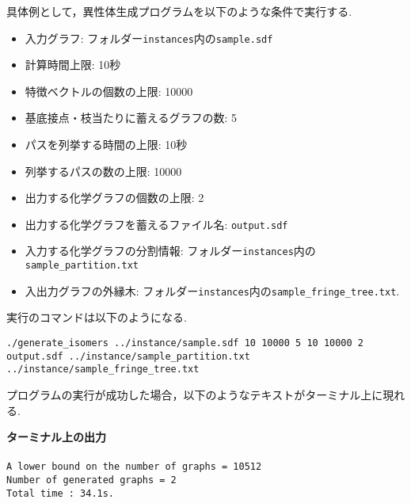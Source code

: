 \documentclass[11pt,titlepage,dvipdfmx,twoside]{jarticle}
\begin{document}
具体例として，異性体生成プログラムを以下のような条件で実行する.

\begin{itemize}
\item 入力グラフ: フォルダー{\tt instances}内の{\tt sample.sdf}
\item 計算時間上限: 10秒
\item 特徴ベクトルの個数の上限: 10000
\item 基底接点・枝当たりに蓄えるグラフの数: 5
\item パスを列挙する時間の上限: 10秒
\item 列挙するパスの数の上限: 10000
\item 出力する化学グラフの個数の上限: 2
\item 出力する化学グラフを蓄えるファイル名: {\tt output.sdf}
\item 入力する化学グラフの分割情報: 
フォルダー{\tt instances}内の{\tt sample\_partition.txt}
\item 入出力グラフの外縁木: 
フォルダー{\tt instances}内の{\tt sample\_fringe\_tree.txt}.
\end{itemize}

実行のコマンドは以下のようになる.

\bigskip


{\tt ./generate\_isomers ../instance/sample.sdf 10 10000 5 10 10000 2} \\
 {\tt output.sdf ../instance/sample\_partition.txt }\\
 {\tt../instance/sample\_fringe\_tree.txt}
%
\bigskip

プログラムの実行が成功した場合，以下のようなテキストがターミナル上に現れる.

\begin{oframed}
{\bf ターミナル上の出力}\\\\
{\tt A lower bound on the number of graphs = 10512\\
Number of generated graphs = 2\\
Total time : 34.1s.}
\end{oframed}
\end{document}

